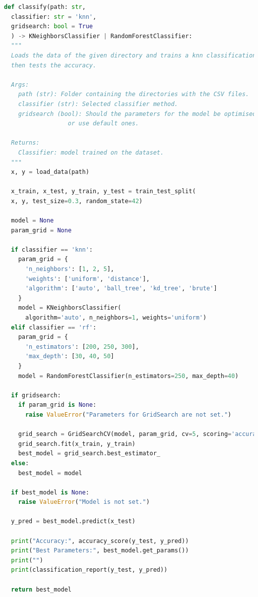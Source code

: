 \documentclass[11pt,
  oneside,openany,    %
]{scrreprt}
\begin{document}
\begin{lstlisting}[language=python, caption=Classifier Function, label=lst:classifier]
def classify(path: str,
  classifier: str = 'knn',
  gridsearch: bool = True
  ) -> KNeighborsClassifier | RandomForestClassifier:
  """
  Loads the data of the given directory and trains a knn classification algorithm, 
  then tests the accuracy. 

  Args:
    path (str): Folder containing the directories with the CSV files.
    classifier (str): Selected classifier method.
    gridsearch (bool): Should the parameters for the model be optimised via gridsearch 
                  or use default ones.

  Returns:
    Classifier: model trained on the dataset.
  """
  x, y = load_data(path)

  x_train, x_test, y_train, y_test = train_test_split(
  x, y, test_size=0.3, random_state=42)

  model = None
  param_grid = None

  if classifier == 'knn':
    param_grid = {
      'n_neighbors': [1, 2, 5],
      'weights': ['uniform', 'distance'],
      'algorithm': ['auto', 'ball_tree', 'kd_tree', 'brute']
    }
    model = KNeighborsClassifier(
      algorithm='auto', n_neighbors=1, weights='uniform')
  elif classifier == 'rf':
    param_grid = {
      'n_estimators': [200, 250, 300],
      'max_depth': [30, 40, 50]
    }
    model = RandomForestClassifier(n_estimators=250, max_depth=40)

  if gridsearch:
    if param_grid is None:
      raise ValueError("Parameters for GridSearch are not set.")

    grid_search = GridSearchCV(model, param_grid, cv=5, scoring='accuracy')
    grid_search.fit(x_train, y_train)
    best_model = grid_search.best_estimator_
  else:
    best_model = model

  if best_model is None:
    raise ValueError("Model is not set.")

  y_pred = best_model.predict(x_test)

  print("Accuracy:", accuracy_score(y_test, y_pred))
  print("Best Parameters:", best_model.get_params())
  print("")
  print(classification_report(y_test, y_pred))

  return best_model
\end{lstlisting}
\end{document}
